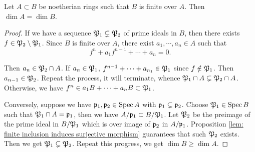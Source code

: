     \begin{proposition}\label{prop: finite morphisms preserve dimension}
        Let $A \subset B$ be noetherian rings such that $B$ is finite over $A$.
        Then $\dim A = \dim B$.
    \end{proposition}
    \begin{proof}
        If we have a sequence ${\mathfrak{P}}_1 \subsetneq {\mathfrak{P}}_2$ of prime ideals in $B$, then there exists $f \in {\mathfrak{P}}_2 \setminus {\mathfrak{P}}_1$.
        Since $B$ is finite over $A$, there exist $a_1,\cdots,a_n \in A$ such that 
        \[ f^n + a_1f^{n-1} + \cdots + a_n = 0.\]

        Then $a_n \in {\mathfrak{P}}_2 \cap A$.
        If $a_n \in {\mathfrak{P}}_1$, $f^{n-1} + \cdots + a_{n_1} \in {\mathfrak{P}}_1$ since $f \notin {\mathfrak{P}}_1$.
        Then $a_{n-1} \in {\mathfrak{P}}_2$.
        Repeat the process, it will terminate, whence ${\mathfrak{P}}_1 \cap A \subsetneq {\mathfrak{P}}_2 \cap A$.
        Otherwise, we have $f^n \in a_1 B+ \cdots + a_nB \subset {\mathfrak{P}}_1$.

        Conversely, suppose we have ${\mathfrak{p}}_1,{\mathfrak{p}}_2 \in \operatorname{Spec} A$ with ${\mathfrak{p}}_1 \subsetneq {\mathfrak{p}}_2$.
        Choose ${\mathfrak{P}}_1 \in \operatorname{Spec} B$ such that ${\mathfrak{P}}_1 \cap A = {\mathfrak{p}}_1$, then we have $A/{\mathfrak{p}}_1 \subset B/{\mathfrak{P}}_1$.
        Let ${\mathfrak{P}}_2$ be the preimage of the prime ideal in $B/{\mathfrak{P}}_1$ which is over image of ${\mathfrak{p}}_2$ in $A/{\mathfrak{p}}_1$.
        Proposition \ref{lem: finite inclusion induces surjective morphism} guarantees that such ${\mathfrak{P}}_2$ exists.
        Then we get ${\mathfrak{P}}_1 \subsetneq {\mathfrak{P}}_2$.
        Repeat this progress, we get $\dim B \geq \dim A$.
    \end{proof}

